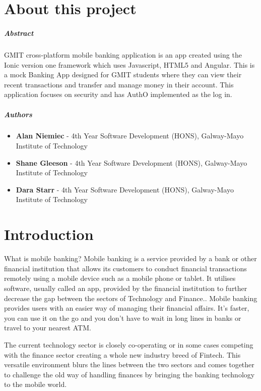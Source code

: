 
\chapter*{About this project}
\paragraph{Abstract}
GMIT cross-platform mobile banking application is an app created using the Ionic version one framework which uses Javascript, HTML5 and Angular. This is a mock Banking App designed for GMIT students where they can view their recent transactions and transfer and manage money in their account. This application focuses on security and has AuthO implemented as the log in.

\paragraph{Authors}
    \begin{itemize}
    \item \textbf{Alan Niemiec} - 4th Year Software Development (HONS), Galway-Mayo Institute of Technology
    \item \textbf{Shane Gleeson} - 4th Year Software Development (HONS), Galway-Mayo Institute of Technology
    \item \textbf{Dara Starr} - 4th Year Software Development (HONS), Galway-Mayo Institute of Technology
    \end{itemize}



\chapter{Introduction}
What is mobile banking? Mobile banking is a service provided by a bank or other financial institution that allows its customers to conduct financial transactions remotely using a mobile device such as a mobile phone or tablet\cite{mobilebankingwiki}. It utilises software, usually called an app, provided by the financial institution to further decrease the gap between the sectors of Technology and Finance.\cite{mobilebankingwiki}. Mobile banking provides users with an easier way of managing their financial affairs. It's faster, you can use it on the go and you don't have to wait in long lines in banks or travel to your nearest ATM.

The current technology sector is closely co-operating or in some cases competing with the finance sector creating a whole new industry breed of Fintech. This versatile environment blurs the lines between the two sectors and comes together to challenge the old way of handling finances by bringing the banking technology to the mobile world.\cite{fintech}

